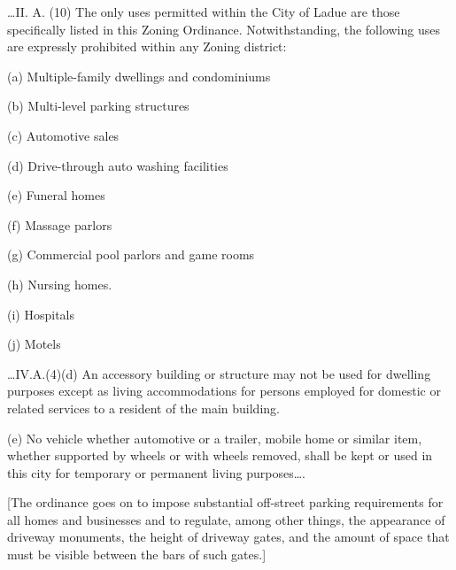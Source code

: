 
\ldots II. A. (10) The only uses permitted within the City of Ladue are those
specifically listed in this Zoning Ordinance. Notwithstanding, the following
uses are expressly prohibited within any Zoning district:
\begin{statute}
\item (a) Multiple-family dwellings and condominiums

\item (b) Multi-level parking structures

\item (c) Automotive sales

\item (d) Drive-through auto washing facilities

\item (e) Funeral homes

\item (f) Massage parlors

\item (g) Commercial pool parlors and game rooms

\item (h) Nursing homes.

\item (i) Hospitals

\item (j) Motels
\end{statute}



\ldots IV.A.(4)(d) An accessory building or structure may not be used for
dwelling purposes except as living accommodations for persons employed for
domestic or related services to a resident of the main building.

(e) No vehicle whether automotive or a trailer, mobile home or similar item,
whether supported by wheels or with wheels removed, shall be kept or used in
this city for temporary or permanent living purposes\ldots.

[The ordinance goes on to impose substantial off-street parking requirements for
all homes and businesses and to regulate, among other things, the appearance of
driveway monuments, the height of driveway gates, and the amount of space that
must be visible between the bars of such gates.]

